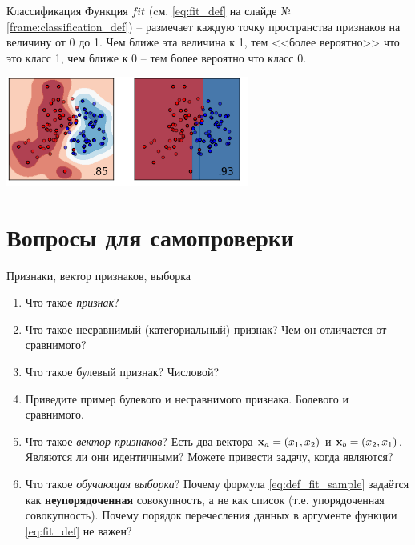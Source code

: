 \documentclass{beamer}
\newcommand{\term}{\textit}
\begin{document}
  
  \begin{frame}{Классификация}
  	Функция $fit$ (cм. \eqref{eq:fit_def} на слайде №\ref{frame:classification_def}) -- размечает каждую точку пространства признаков на величину от 0 до 1. Чем ближе эта величина к 1, тем <<более вероятно>> что это класс 1, чем ближе к 0 -- тем более вероятно что класс 0.
    \begin{center}
    	\includegraphics[width=8cm]{pic/classification_example.png}\centering
    \end{center}
	
  \end{frame}

   
   \section{Вопросы для самопроверки}

   \begin{frame}{Признаки, вектор признаков, выборка}
   \begin{enumerate}
   	\item Что такое \term{признак}?
   	\item Что такое несравнимый (категориальный) признак? Чем он отличается от сравнимого?
   	\item Что такое булевый признак? Числовой?
   	\item Приведите пример булевого и несравнимого признака. Болевого и сравнимого. 
   	\item Что такое \term{вектор признаков}? Есть два вектора $\bold x_a = (x_1, x_2)$ и $\bold x_b = (x_2, x_1)$.
   	Являются ли они идентичными? Можете привести задачу, когда являются?
   	\item Что такое \term{обучающая выборка}? Почему формула \eqref{eq:def_fit_sample} задаётся
   	как \textbf{неупорядоченная} совокупность, а не как список (т.е. упорядоченная совокупность).
   	Почему порядок перечесления данных в аргументе функции \eqref{eq:fit_def} не важен?
   \end{enumerate}
	\end{frame}
\end{document}
